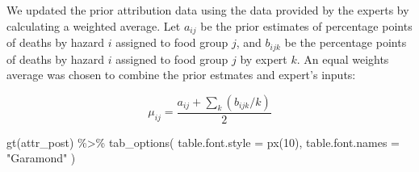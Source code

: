 \documentclass[
  letterpaper,
  DIV=11,
  numbers=noendperiod]{scrartcl}
\newenvironment{Shaded}{\begin{snugshade}}{\end{snugshade}}
\newcommand{\AttributeTok}[1]{\textcolor[rgb]{0.40,0.45,0.13}{#1}}
\newcommand{\DecValTok}[1]{\textcolor[rgb]{0.68,0.00,0.00}{#1}}
\newcommand{\FunctionTok}[1]{\textcolor[rgb]{0.28,0.35,0.67}{#1}}
\newcommand{\NormalTok}[1]{\textcolor[rgb]{0.00,0.23,0.31}{#1}}
\newcommand{\SpecialCharTok}[1]{\textcolor[rgb]{0.37,0.37,0.37}{#1}}
\newcommand{\StringTok}[1]{\textcolor[rgb]{0.13,0.47,0.30}{#1}}
\begin{document}
We updated the prior attribution data using the data provided by the
experts by calculating a weighted average. Let \(a_{ij}\) be the prior
estimates of percentage points of deaths by hazard \(i\) assigned to
food group \(j\), and \(b_{ijk}\) be the percentage points of deaths by
hazard \(i\) assigned to food group \(j\) by expert \(k\). An equal
weights average was chosen to combine the prior estmates and expert's
inputs:

\[ \mu_{ij}=\frac{a_{ij}+\sum_{k} (b_{ijk}/k)}{2}\]

\begin{Shaded}
\begin{Highlighting}[]
\FunctionTok{gt}\NormalTok{(attr\_post) }\SpecialCharTok{\%\textgreater{}\%} 
  \FunctionTok{tab\_options}\NormalTok{(}
    \AttributeTok{table.font.style =} \FunctionTok{px}\NormalTok{(}\DecValTok{10}\NormalTok{),}
    \AttributeTok{table.font.names =} \StringTok{"Garamond"}
\NormalTok{  )}
\end{Highlighting}
\end{Shaded}

\begin{table}

\caption{\label{tbl-post-attr}Posterior attribution combining estimates
from experts in Ethiopia and from FERG}


\end{table}%
\end{document}
